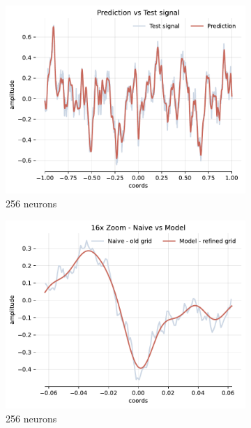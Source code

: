 \begin{figure}[h]
    \begin{subfigure}[b]{0.32\textwidth}
        \centering
        \includegraphics[width=\textwidth]{img/ch3/pred-1hl-256hf-2hz.pdf}
        \caption{256 neurons}
        \label{fig:pred-1hl-256hf-2hz}
    \end{subfigure}
    \begin{subfigure}[b]{0.32\textwidth}
        \centering
        \includegraphics[width=\textwidth]{img/ch3/16x-zoom-1hl-256hf-2hz.pdf}
        \caption{256 neurons}
        \label{fig:16x-zoom-1hl-256hf-2hz}
    \end{subfigure}
    \begin{subfigure}[b]{0.32\textwidth}

\end{subfigure}
\end{figure}
